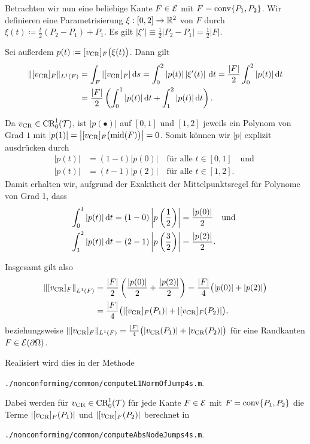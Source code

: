 Betrachten wir nun eine beliebige Kante $F\in\mathcal{E}$ mit $F=\textup{conv}\{P_1,P_2\}$. 
Wir definieren eine Parametrisierung $\xi:[0,2]\to\mathbb{R}^2$ von $F$ durch
$\xi(t)\coloneqq \frac{t}{2}(P_2-P_1)+P_1$. 
Es gilt $\left|\xi'\right|\equiv \frac{1}{2}|P_2-P_1|=\frac{1}{2}|F|$.

Sei außerdem
$p(t)\coloneqq [v_\textup{CR}]_F\big(\xi(t)\big)$. Dann gilt
\begin{align*}
  \Vert [v_\textup{CR}]_F\Vert_{L^1(F)} 
  &=
  \int_F |[v_\textup{CR}]_F|\,\mathrm{d}s 
  = \int_0^2 |p(t)|\left|\xi'(t)\right|\,\mathrm{d}t
  = \frac{|F|}{2}\int_0^2 |p(t)|\,\mathrm{d}t\\
  &= \frac{|F|}{2}\left(\int_0^1 |p(t)|\,\mathrm{d}t + \int_1^2 |p(t)|\,\mathrm{d}t\right).
\end{align*}

Da $v_\textup{CR}\in\textup{CR}^1_0(\mathcal{T})$, ist $|p(\bullet)|$ auf $[0,1]$ und $[1,2]$ jeweils
ein Polynom von Grad $1$ mit $|p(1)|=\left|[v_\textup{CR}]_F\big(\textup{mid}(F)\big)\right|=0$. 
Somit können wir $|p|$ explizit ausdrücken durch
\begin{align*}
  |p(t)|&=(1-t)|p(0)| \quad\text{für alle }t\in[0,1] \quad\text{und }\\
  |p(t)|&=(t-1)|p(2)| \quad\text{für alle }t\in[1,2].
\end{align*}
Damit erhalten wir, aufgrund der Exaktheit der Mittelpunktsregel für Polynome
von Grad 1, dass
\begin{align*}
  \int_0^1 |p(t)|\,\mathrm{d}t 
  &= 
  (1-0)\left|p\left( \frac{1}{2} \right)\right|
  =
  \frac{|p(0)|}{2}\quad\text{und }\\
  \int_1^2 |p(t)|\,\mathrm{d}t 
  &= 
  (2-1)\left|p\left( \frac{3}{2} \right)\right|
  =
  \frac{|p(2)|}{2}.
\end{align*}

Insgesamt gilt also
\begin{align*}
  \left\Vert [v_\textup{CR}]_F\right\Vert_{L^1(F)} 
  &=
  \frac{|F|}{2}\left(\frac{|p(0)|}{2} + \frac{|p(2)|}{2}\right)
  =
  \frac{|F|}{4}\big(|p(0)|+|p(2)|\big)\\
  &= 
  \frac{|F|}{4}\big(|[v_\textup{CR}]_F(P_1)|+|[v_\textup{CR}]_F(P_2)|\big),
\end{align*}
beziehungsweise 
  $\Vert [v_\textup{CR}]_F\Vert_{L^1(F)} =
  \frac{|F|}{4}\big(|v_\textup{CR}(P_1)|+|v_\textup{CR}(P_2)|\big)$ für eine Randkanten
  $F\in\mathcal{E}(\partial\Omega)$.

Realisiert wird dies in der Methode
\begin{center}
  \texttt{./nonconforming/common/computeL1NormOfJump4s.m}.
\end{center}
Dabei werden für $v_\textup{CR}\in\textup{CR}^1_0(\mathcal{T})$ für jede Kante $F\in\mathcal{E}$ mit
$F=\textup{conv}\{P_1,P_2\}$ die Terme $|[v_\textup{CR}]_F(P_1)|$ und $|[v_\textup{CR}]_F(P_2)|$
berechnet in
\begin{center}
  \texttt{./nonconforming/common/computeAbsNodeJumps4s.m}.
\end{center}


